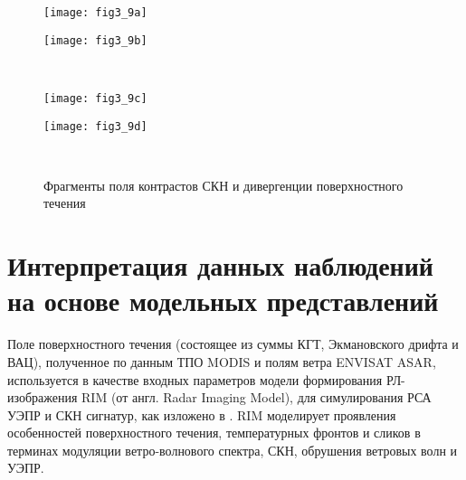 \begin{figure}[H]
   	\centering
	\begin{minipage}{.47\textwidth}
	    \subcaptionbox{\label{fig:3.9a}}
		{\texttt{[image: fig3\_9a]}}
	\end{minipage}
	\hfill
	\begin{minipage}{.47\textwidth}
	    \subcaptionbox{\label{fig:3.9b}}
		{\texttt{[image: fig3\_9b]}}
	\end{minipage}
	\\
	\begin{minipage}{.47\textwidth}
	    \subcaptionbox{\label{fig:3.9c}}
		{\texttt{[image: fig3\_9c]}}
	\end{minipage}
	\hfill
	\begin{minipage}{.47\textwidth}
	    \subcaptionbox{\label{fig:3.9d}}
		{\texttt{[image: fig3\_9d]}}
	\end{minipage}
    \\
    \caption{Фрагменты поля контрастов СКН и дивергенции поверхностного течения}
    \label{fig:3.9}
\end{figure}



\section{Интерпретация данных наблюдений на основе модельных представлений} \label{sec:3.3}


Поле поверхностного течения (состоящее из суммы КГТ, Экмановского дрифта и ВАЦ), полученное по данным ТПО MODIS и полям ветра ENVISAT ASAR, используется в качестве входных параметров модели формирования РЛ-изображения RIM (от англ. Radar Imaging Model), для симулирования РСА УЭПР и СКН сигнатур, как изложено в \citep{Kudryavtsev2005,Johannessen2005}. RIM моделирует проявления особенностей поверхностного течения, температурных фронтов и сликов в терминах модуляции ветро-волнового спектра, СКН, обрушения ветровых волн и УЭПР. 

